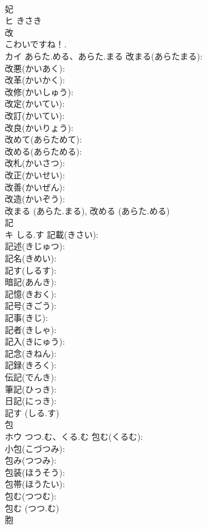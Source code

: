\documentclass[8pt]{extreport}
\begin{document}
\begin{CJK}{UTF8}{min}
\\	妃		
\\	ヒ	きさき		
\\	改		
\\	こわいですね！.	
\\	カイ	あらた.める、あらた.まる	改まる(あらたまる): 
\\	改悪(かいあく): 
\\	改革(かいかく): 
\\	改修(かいしゅう): 
\\	改定(かいてい): 
\\	改訂(かいてい): 
\\	改良(かいりょう): 
\\	改めて(あらためて): 
\\	改める(あらためる): 
\\	改札(かいさつ): 
\\	改正(かいせい): 
\\	改善(かいぜん): 
\\	改造(かいぞう): 
\\	改まる (あらた.まる), 改める (あらた.める)
\\	記		
\\	キ	しる.す	記載(きさい): 
\\	記述(きじゅつ): 
\\	記名(きめい): 
\\	記す(しるす): 
\\	暗記(あんき): 
\\	記憶(きおく): 
\\	記号(きごう): 
\\	記事(きじ): 
\\	記者(きしゃ): 
\\	記入(きにゅう): 
\\	記念(きねん): 
\\	記録(きろく): 
\\	伝記(でんき): 
\\	筆記(ひっき): 
\\	日記(にっき): 
\\	記す (しる.す)
\\	包		
\\	ホウ	つつ.む、くる.む	包む(くるむ): 
\\	小包(こづつみ): 
\\	包み(つつみ): 
\\	包装(ほうそう): 
\\	包帯(ほうたい): 
\\	包む(つつむ): 
\\	包む (つつ.む)
\\	胞		

\end{CJK}
\end{document}
